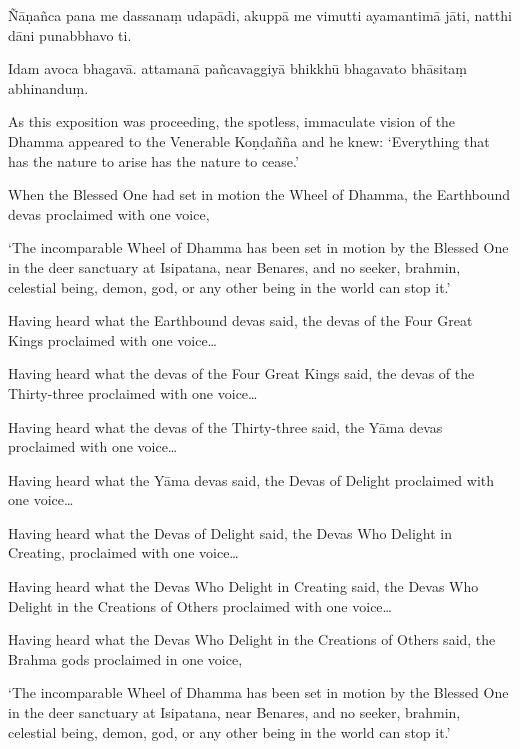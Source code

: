 Ñāṇañca pana me dassanaṃ udapādi, akuppā me vimutti ayamantimā jāti,
natthi dāni punabbhavo ti.


Idam avoca bhagavā. attamanā pañcavaggiyā bhikkhū bhagavato bhāsitaṃ
abhinanduṃ.

\clearpage

\englishText
\markboth{\englishTitle}{\rightmark}

As this exposition was proceeding, the spotless, immaculate vision of
the Dhamma appeared to the Venerable Koṇḍañña and he knew: ‘Everything
that has the nature to arise has the nature to cease.’

When the Blessed One had set in motion the Wheel of Dhamma, the
Earthbound devas proclaimed with one voice,

‘The incomparable Wheel of Dhamma has been set in motion by the Blessed
One in the deer sanctuary at Isipatana, near Benares, and no seeker,
brahmin, celestial being, demon, god, or any other being in the world
can stop it.’

Having heard what the Earthbound devas said, the devas of the Four Great
Kings proclaimed with one voice\ldots

Having heard what the devas of the Four Great Kings said, the devas of
the Thirty-three proclaimed with one voice\ldots

Having heard what the devas of the Thirty-three said, the Yāma devas
proclaimed with one voice\ldots

Having heard what the Yāma devas said, the Devas of Delight proclaimed
with one voice\ldots

Having heard what the Devas of Delight said, the Devas Who Delight in
Creating, proclaimed with one voice\ldots

Having heard what the Devas Who Delight in Creating said, the Devas Who
Delight in the Creations of Others proclaimed with one voice\ldots

Having heard what the Devas Who Delight in the Creations of Others said,
the Brahma gods proclaimed in one voice,

‘The incomparable Wheel of Dhamma has been set in motion by the Blessed
One in the deer sanctuary at Isipatana, near Benares, and no seeker,
brahmin, celestial being, demon, god, or any other being in the world
can stop it.’

\clearpage

\paliText
\markboth{\paliTitle}{\rightmark}

